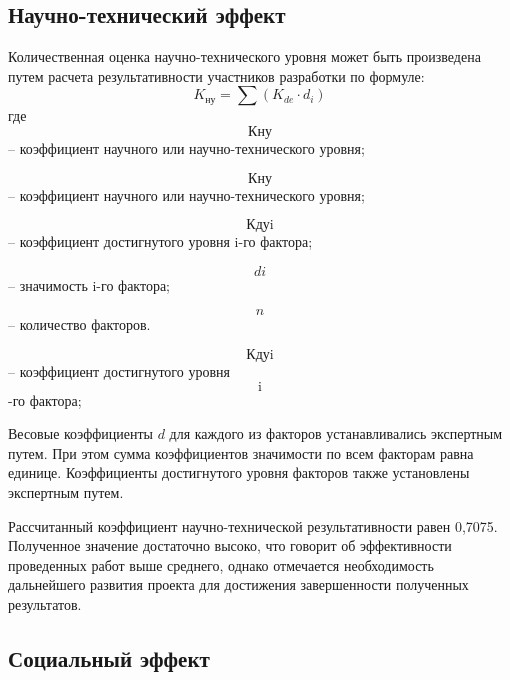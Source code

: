 \subsection{Научно-технический эффект}
Количественная оценка научно-технического уровня может быть произведена путем расчета результативности участников разработки по формуле:
\begin{equation}
K_{\text{ну}}=\sum (K_{de} \cdot d_i)
\end{equation}
где $$К\text{ну}$$ – коэффициент научного или научно-технического уровня;

$$К\text{ну}$$ – коэффициент научного или научно-технического уровня;

$$К\text{дуi}$$ – коэффициент достигнутого уровня i-го фактора;

$$di$$ – значимость i-го фактора;

$$n$$ – количество факторов.

$$К\text{дуi}$$ – коэффициент достигнутого уровня $$\text{i}$$-го фактора;

Весовые коэффициенты $d$ для каждого из факторов устанавливались экспертным путем. При этом сумма коэффициентов значимости по всем факторам равна единице. Коэффициенты достигнутого уровня факторов также установлены экспертным путем.

Рассчитанный коэффициент научно-технической результативности равен 0,7075. Полученное значение достаточно высоко, что говорит об эффективности проведенных работ выше среднего, однако отмечается необходимость дальнейшего развития проекта для достижения завершенности полученных результатов.

\subsection{Социальный эффект}